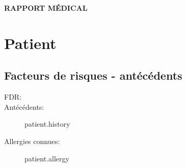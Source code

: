 \documentclass[headlines=6,headinclude=true,11pt]{scrartcl}
\begin{document}
\begin{center}
  \textcolor{Gris}{\bfseries{\huge{\textsf{RAPPORT MÉDICAL}}} }
\end{center}

  \section*{Patient}
    \subsection*{Facteurs de risques - antécédents }
      \begin{description}
        
      \item[FDR:]
        
        \begin{itemize}
          {%
            {%
              {%
                {%
                  {%
                    {%
                      
                    \end{itemize}

                  \item[Antécédents:]
                    {{ patient.history }}
                  \item[Allergies connues:] {{ patient.allergy }}
                  \end{description}
\end{document}
